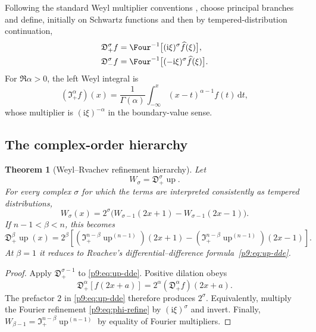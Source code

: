 \documentclass[11pt,oneside]{article}
\newtheorem{theorem}{Theorem}[section]
\theoremstyle{definition}
\theoremstyle{remark}
\newcommand{\Up}{\operatorname{up}}
\newcommand{\dd}{\,\mathrm d}
\newcommand{\ii}{\mathrm i}
\newcommand{\1}{\mathbf 1}
\begin{document}
Following the standard Weyl multiplier conventions \cite{p9:Samko}, choose
principal branches and define, initially on Schwartz functions and then by
tempered-distribution continuation,
\begin{align}
 \mathfrak D_+^\sigma f
 &=\Four^{-1}\bigl[(\ii\xi)^\sigma\widehat f(\xi)\bigr],
 \label{p9:eq:Weyl-left}\\
 \mathfrak D_-^\sigma f
 &=\Four^{-1}\bigl[(-\ii\xi)^\sigma\widehat f(\xi)\bigr].
 \label{p9:eq:Weyl-right}
\end{align}
For $\Re\alpha>0$, the left Weyl integral is
\begin{equation}
 (\mathfrak I_+^\alpha f)(x)
 =\frac1{\Gamma(\alpha)}
  \int_{-\infty}^x(x-t)^{\alpha-1}f(t)\dd t,
 \label{p9:eq:Weyl-integral}
\end{equation}
whose multiplier is $(\ii\xi)^{-\alpha}$ in the boundary-value sense.

\subsection{The complex-order hierarchy}

\begin{theorem}[Weyl--Rvachev refinement hierarchy]
\label{p9:thm:Weyl-hierarchy}
Let
\begin{equation}
 W_\sigma=\mathfrak D_+^\sigma\Up.
 \label{p9:eq:W-sigma}
\end{equation}
For every complex $\sigma$ for which the terms are interpreted consistently
as tempered distributions,
\begin{equation}
 W_\sigma(x)=2^\sigma
 \bigl(W_{\sigma-1}(2x+1)-W_{\sigma-1}(2x-1)\bigr).
 \label{p9:eq:Weyl-refinement}
\end{equation}
If $n-1<\beta<n$, this becomes
\begin{equation}
 \mathfrak D_+^\beta\Up(x)
 =2^\beta\left[
  (\mathfrak I_+^{n-\beta}\Up^{(n-1)})(2x+1)
 -(\mathfrak I_+^{n-\beta}\Up^{(n-1)})(2x-1)
 \right].
 \label{p9:eq:Weyl-real-order}
\end{equation}
At $\beta=1$ it reduces to Rvachev's differential--difference
formula~\eqref{p9:eq:up-dde}.
\end{theorem}

\begin{proof}
Apply $\mathfrak D_+^{\sigma-1}$ to
\cref{p9:eq:up-dde}.  Positive dilation obeys
\[
 \mathfrak D_+^\alpha[f(2x+a)]
 =2^\alpha(\mathfrak D_+^\alpha f)(2x+a).
\]
The prefactor $2$ in \cref{p9:eq:up-dde} therefore produces $2^\sigma$.
Equivalently, multiply the Fourier refinement
\cref{p9:eq:phi-refine} by $(\ii\xi)^\sigma$ and invert.  Finally,
$W_{\beta-1}=\mathfrak I_+^{n-\beta}\Up^{(n-1)}$ by equality of Fourier
multipliers.
\end{proof}
\end{document}
